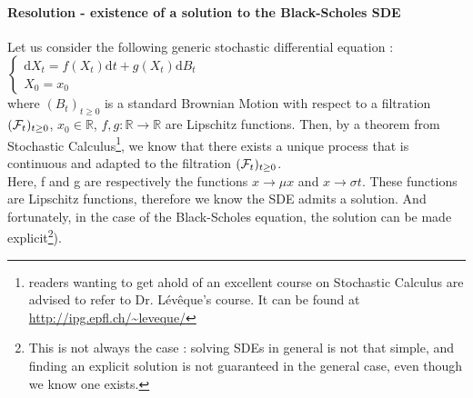 \paragraph{Resolution - existence of a solution to the Black-Scholes SDE}
Let us consider the following generic stochastic differential equation : \\
$\left\{
\begin{array}{l}
\mathrm{d}X_t = f(X_t) \mathrm{d}t + g(X_t) \mathrm{d}B_t\\
X_0 = x_0
\end{array}
\right.$ \\ where $(B_t)_{t \ge 0}$ is a standard Brownian Motion with respect to a filtration $({\cal{F}}_t)_{t \ge 0}$, $x_0 \in \mathbb{R}$, $f,g : \mathbb{R} \longrightarrow \mathbb{R}$ are Lipschitz functions. Then, by a theorem from Stochastic Calculus\footnote{readers wanting to get ahold of an excellent course on Stochastic Calculus are advised to refer to Dr. Lév\^{e}que's course. It can be found at \url{http://ipg.epfl.ch/~leveque/}}, we know that there exists a unique process that is continuous and adapted to the filtration $({\cal{F}}_t)_{t \ge 0}$. \\
Here, f and g are respectively the functions $x \longrightarrow \mu x$ and $x \longrightarrow \sigma t$. These functions are Lipschitz functions, therefore we know the SDE admits a solution. And fortunately, in the case of the Black-Scholes equation, the solution can be made explicit\footnote{This is not always the case : solving SDEs in general is not that simple, and finding an explicit solution is not guaranteed in the general case, even though we know one exists.}).
